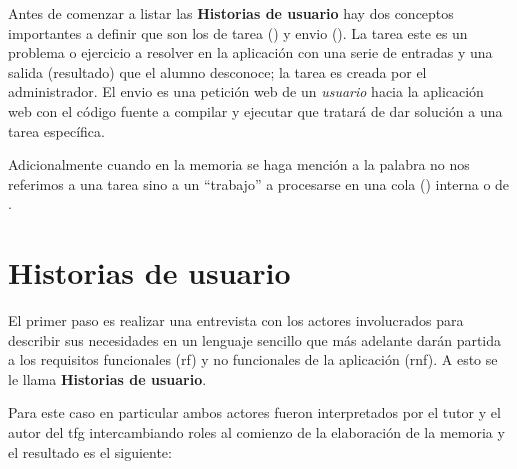 \documentclass[11pt,spanish,listoffigures,listoftables]{tfgetsinf}
\begin{document}
Antes de comenzar a listar las \textbf{Historias de usuario} hay dos conceptos importantes a definir que son los de \gls{tarea} () y \gls{envio} (). La \gls{tarea} este es un problema o ejercicio a resolver en la aplicación con una serie de entradas y una salida (resultado) que el \gls{alumno} desconoce; la \gls{tarea} es creada por el \gls{administrador}. El \gls{envio} es una petición web de un \textit{usuario} hacia la aplicación web con el código fuente a compilar y ejecutar que tratará de dar solución a una \gls{tarea} específica. 

Adicionalmente cuando en la memoria se haga mención a la palabra  no nos referimos a una \gls{tarea} sino a un ``trabajo'' a procesarse en una cola () interna o de \kahan.

\section{Historias de usuario}

El primer paso es realizar una entrevista con los actores involucrados para describir sus necesidades en un lenguaje sencillo que más adelante darán partida a los requisitos funcionales (\acrshort{rf})  y no funcionales de la aplicación (\acrshort{rnf}). A esto se le llama \textbf{Historias de usuario}. \par

Para este caso en particular ambos actores fueron interpretados por el tutor y el autor del \acrshort{tfg} intercambiando roles al comienzo de la elaboración de la memoria y el resultado es el siguiente:
\end{document}
